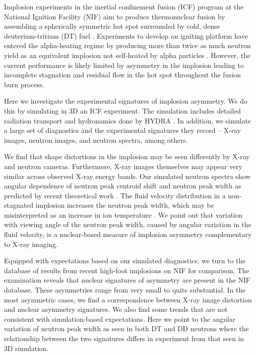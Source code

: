 \documentclass[aip,pop,numerical,reprint,floatfix]{revtex4-1}
\begin{document}
Implosion experiments in the inertial confinement fusion (ICF) program
at the National Ignition Facility (NIF) aim to produce thermonuclear
fusion by assembling a spherically symmetric hot spot surrounded by
cold, dense deuterium-tritium (DT) fuel \cite{edwards_nif_progress_2012}.
Experiments to develop an igniting platform have entered the alpha-heating
regime by producing more than twice as much neutron yield as an equivalent
implosion not self-heated by alpha particles \cite{hurricane_nature,hurricane_nature_corrigendum}.
However, the current performance is likely limited by asymmetry in
the implosion leading to incomplete stagnation and residual flow in
the hot spot throughout the fusion burn process. 

Here we investigate the experimental signatures of implosion asymmetry.
We do this by simulating in 3D an ICF experiment. The simulation includes
detailed radiation transport and hydronamics done by HYDRA \cite{marinak_hydra_2001}. In addition,
we simulate a large set of diagnostics and the experimental signatures
they record -- X-ray images, neutron images, and neutron spectra,
among others. 

We find that shape distortions in the implosion may be seen differently
by X-ray and neutron cameras. Furthermore, X-ray images themselves
may appear very similar across observed X-ray energy bands. Our simulated
neutron spectra show angular dependence of neutron peak centroid shift
and neutron peak width as predicted by recent theoretical work \cite{appelbe_relativ_2014,murphy_neut_spectrum}.
The fluid velocity distribution in a non-stagnated implosion increases
the neutron peak width, which may be misinterpreted as an increase
in ion temperature \cite{brysk_tion_1973}. We point out that variation
with viewing angle of the neutron peak width, caused by angular variation
in the fluid velocity, is a nuclear-based measure of implosion asymmetry
complementary to X-ray imaging.

Equipped with expectations based on our simulated diagnostics, we
turn to the database of results from recent high-foot implosions on
NIF for comparison. The examination reveals that nuclear signatures
of asymmetry are present in the NIF database. These asymmetries range
from very small to quite substantial. In the most asymmetric cases,
we find a correspondence between X-ray image distortion and nuclear
asymmetry signatures. We also find some trends that are not consistent
with simulation-based expectations. Here we point to the angular variation
of neutron peak width as seen in both DT and DD neutrons where the
relationship between the two signatures differs in experiment from
that seen in 3D simulation. 
\end{document}
